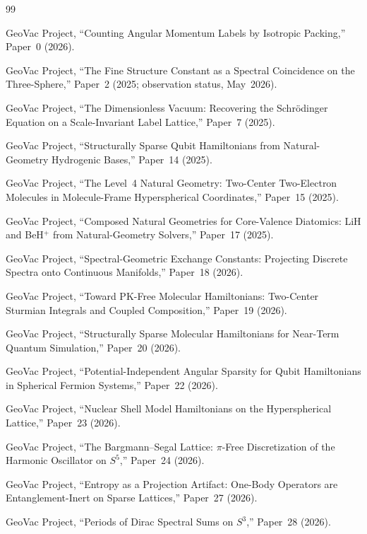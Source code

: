 \documentclass[11pt]{article}
\begin{document}
\begin{thebibliography}{99}

GeoVac Project, ``Counting Angular Momentum Labels by Isotropic Packing,'' Paper~0 (2026).

GeoVac Project, ``The Fine Structure Constant as a Spectral Coincidence on the Three-Sphere,'' Paper~2 (2025; observation status, May~2026).

GeoVac Project, ``The Dimensionless Vacuum: Recovering the Schr\"odinger Equation on a Scale-Invariant Label Lattice,'' Paper~7 (2025).

GeoVac Project, ``Structurally Sparse Qubit Hamiltonians from Natural-Geometry Hydrogenic Bases,'' Paper~14 (2025).

GeoVac Project, ``The Level~4 Natural Geometry: Two-Center Two-Electron
Molecules in Molecule-Frame Hyperspherical Coordinates,'' Paper~15 (2025).

GeoVac Project, ``Composed Natural Geometries for Core-Valence Diatomics: LiH and BeH$^+$ from Natural-Geometry Solvers,'' Paper~17 (2025).

GeoVac Project, ``Spectral-Geometric Exchange Constants: Projecting Discrete Spectra onto Continuous Manifolds,'' Paper~18
(2026).

GeoVac Project, ``Toward PK-Free Molecular Hamiltonians: Two-Center
Sturmian Integrals and Coupled Composition,'' Paper~19 (2026).

GeoVac Project, ``Structurally Sparse Molecular Hamiltonians for Near-Term Quantum Simulation,''
Paper~20 (2026).

GeoVac Project, ``Potential-Independent Angular Sparsity for Qubit Hamiltonians in Spherical Fermion Systems,''
Paper~22 (2026).

GeoVac Project, ``Nuclear Shell Model Hamiltonians on the Hyperspherical Lattice,''
Paper~23 (2026).

GeoVac Project, ``The Bargmann--Segal Lattice: $\pi$-Free Discretization of the Harmonic Oscillator on $S^5$,'' Paper~24
(2026).

GeoVac Project, ``Entropy as a Projection Artifact: One-Body Operators are Entanglement-Inert on Sparse Lattices,'' Paper~27 (2026).

GeoVac Project, ``Periods of Dirac Spectral Sums on $S^3$,''
Paper~28 (2026).


\end{thebibliography}
\end{document}
